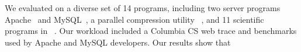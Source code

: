 

We evaluated \tern on a diverse set of 14 programs, including two server
programs Apache~\cite{apache} and MySQL~\cite{mysql}, a parallel
compression utility \pbzip~\cite{pbzip2}, and 11 scientific programs in
\splash~\cite{splash2}.  Our workload included a Columbia CS web trace and
benchmarks used by Apache and MySQL developers.  Our results show that

